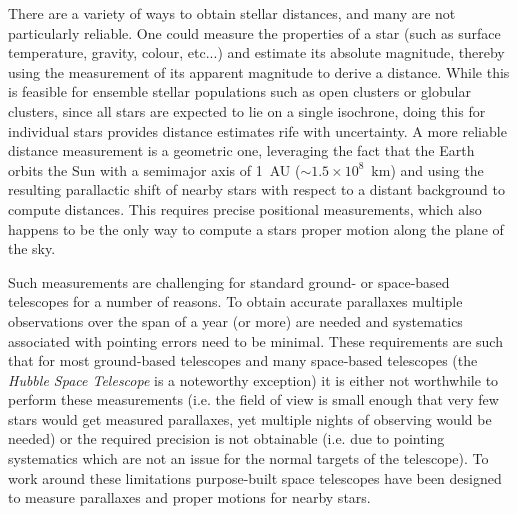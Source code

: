There are a variety of ways to obtain stellar distances, and many are not particularly reliable. One could measure the properties of a star (such as surface temperature, gravity, colour, etc...) and estimate its absolute magnitude, thereby using the measurement of its apparent magnitude to derive a distance. While this is feasible for ensemble stellar populations such as open clusters or globular clusters, since all stars are expected to lie on a single isochrone, doing this for individual stars provides distance estimates rife with uncertainty. A more reliable distance measurement is a geometric one, leveraging the fact that the Earth orbits the Sun with a semimajor axis of 1~AU ($\sim 1.5 \times 10^{8}$~km) and using the resulting parallactic shift of nearby stars with respect to a distant background to compute distances. This requires precise positional measurements, which also happens to be the only way to compute a stars proper motion along the plane of the sky.

Such measurements are challenging for standard ground- or space-based telescopes for a number of reasons. To obtain accurate parallaxes multiple observations over the span of a year (or more) are needed and systematics associated with pointing errors need to be minimal. These requirements are such that for most ground-based telescopes and many space-based telescopes (the \textit{Hubble Space Telescope} is a noteworthy exception) it is either not worthwhile to perform these measurements (i.e. the field of view is small enough that very few stars would get measured parallaxes, yet multiple nights of observing would be needed) or the required precision is not obtainable (i.e. due to pointing systematics which are not an issue for the normal targets of the telescope). To work around these limitations purpose-built space telescopes have been designed to measure parallaxes and proper motions for nearby stars.

